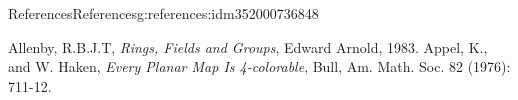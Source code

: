 \documentclass[oneside,10pt,]{book}
\newcommand{\xreffont}{\relax}
\begin{document}
%
\backmatter
%
%
%
\typeout{************************************************}
\typeout{************************************************}
%
\begin{references-chapter-numberless}{References}{}{References}{}{}{g:references:idm352000736848}
\begin{referencelist}
\hypertarget{x:biblio:biblio-allenby-1983}{}Allenby, R.B.J.T, \textit{Rings, Fields and Groups}, Edward Arnold, 1983.
\hypertarget{x:biblio:biblio-appel-1976}{}Appel, K., and W. Haken, \textit{Every Planar Map Is 4-colorable},  Bull, Am. Math. Soc. 82 (1976): 711-12.
\end{referencelist}
\end{references-chapter-numberless}
%
{\xreffont\printindex}
%
\end{document}
